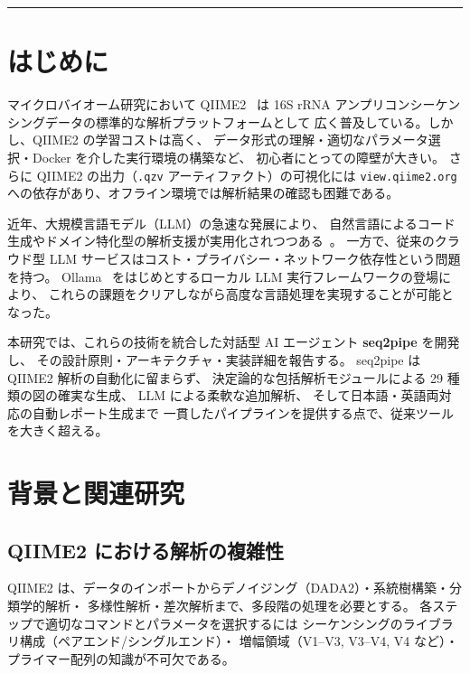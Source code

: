 \documentclass[12pt, a4paper]{article}
\begin{document}
\vspace{4mm}
\hrule
\vspace{6mm}

\section{はじめに}

マイクロバイオーム研究において QIIME2~\cite{qiime2} は
16S rRNA アンプリコンシーケンシングデータの標準的な解析プラットフォームとして
広く普及している。しかし、QIIME2 の学習コストは高く、
データ形式の理解・適切なパラメータ選択・Docker を介した実行環境の構築など、
初心者にとっての障壁が大きい。
さらに QIIME2 の出力（\texttt{.qzv} アーティファクト）の可視化には
\texttt{view.qiime2.org} への依存があり、オフライン環境では解析結果の確認も困難である。

近年、大規模言語モデル（LLM）の急速な発展により、
自然言語によるコード生成やドメイン特化型の解析支援が実用化されつつある~\cite{brown2020gpt3}。
一方で、従来のクラウド型 LLM サービスはコスト・プライバシー・ネットワーク依存性という問題を持つ。
Ollama~\cite{ollama} をはじめとするローカル LLM 実行フレームワークの登場により、
これらの課題をクリアしながら高度な言語処理を実現することが可能となった。

本研究では、これらの技術を統合した対話型 AI エージェント \textbf{seq2pipe} を開発し、
その設計原則・アーキテクチャ・実装詳細を報告する。
seq2pipe は QIIME2 解析の自動化に留まらず、
決定論的な包括解析モジュールによる 29 種類の図の確実な生成、
LLM による柔軟な追加解析、
そして日本語・英語両対応の自動レポート生成まで
一貫したパイプラインを提供する点で、従来ツールを大きく超える。

\section{背景と関連研究}

\subsection{QIIME2 における解析の複雑性}

QIIME2 は、データのインポートからデノイジング（DADA2）・系統樹構築・分類学的解析・
多様性解析・差次解析まで、多段階の処理を必要とする。
各ステップで適切なコマンドとパラメータを選択するには
シーケンシングのライブラリ構成（ペアエンド/シングルエンド）・
増幅領域（V1--V3, V3--V4, V4 など）・プライマー配列の知識が不可欠である。
\end{document}

